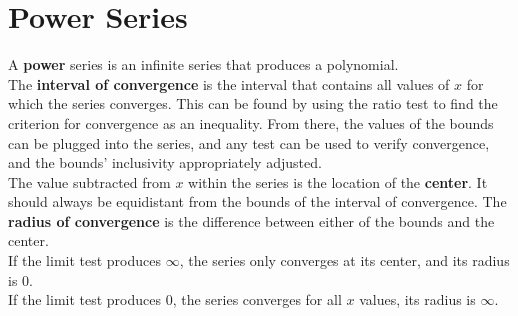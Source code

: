 \documentclass{../AP_Calculus}
\begin{document}
	\chapter{Power Series}
		A \textbf{power} series is an infinite series that produces a polynomial. \\
		The \textbf{interval of convergence} is the interval that contains all values of $x$ for which the series converges. This can be found by using the ratio test to find the criterion for convergence as an inequality. From there, the values of the bounds can be plugged into the series, and any test can be used to verify convergence, and the bounds' inclusivity appropriately adjusted. \\
		The value subtracted from $x$ within the series is the location of the \textbf{center}. It should always be equidistant from the bounds of the interval of convergence. The \textbf{radius of convergence} is the difference between either of the bounds and the center. \\
		If the limit test produces $\infty$, the series only converges at its center, and its radius is 0. \\
		If the limit test produces $0$, the series converges for all $x$ values, its radius is $\infty$.
\end{document}

